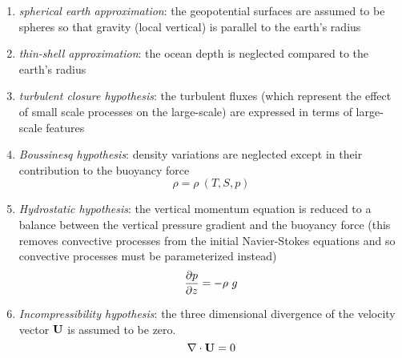 \documentclass[../main/NEMO_manual]{subfiles}
\begin{document}
\begin{enumerate}
\item
  \textit{spherical earth approximation}: the geopotential surfaces are assumed to be spheres so that
  gravity (local vertical) is parallel to the earth's radius
\item
  \textit{thin-shell approximation}: the ocean depth is neglected compared to the earth's radius
\item
  \textit{turbulent closure hypothesis}: the turbulent fluxes
  (which represent the effect of small scale processes on the large-scale)
  are expressed in terms of large-scale features
\item
  \textit{Boussinesq hypothesis}: density variations are neglected except in their contribution to
  the buoyancy force
  \begin{equation}
    \label{eq:PE_eos}
    \rho = \rho \ (T,S,p)
  \end{equation}
\item
  \textit{Hydrostatic hypothesis}: the vertical momentum equation is reduced to a balance between
  the vertical pressure gradient and the buoyancy force
  (this removes convective processes from the initial Navier-Stokes equations and so
  convective processes must be parameterized instead)
  \begin{equation}
    \label{eq:PE_hydrostatic}
    \pd[p]{z} = - \rho \ g
  \end{equation}
\item
  \textit{Incompressibility hypothesis}: the three dimensional divergence of the velocity vector $\mathbf{U}$
  is assumed to be zero.
  \begin{equation}
    \label{eq:PE_continuity}
    \nabla \cdot \vect U = 0
  \end{equation}
\end{enumerate}
\end{document}
